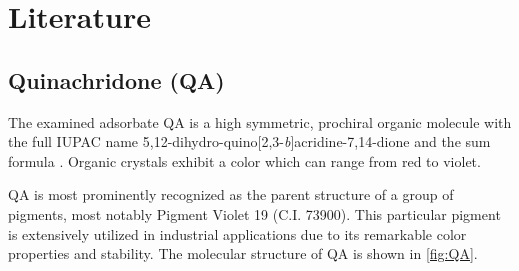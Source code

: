 \chapter{Literature}
\section{Quinachridone (QA)}

The examined adsorbate \acf{QA} is a high symmetric, prochiral organic molecule with the full IUPAC name 5,12-dihydro-quino[2,3-\textit{b}]acridine-7,14-dione and the sum formula . Organic crystals exhibit a color which can range from red to violet.\autocite{ChemicalBook2025,ChemSpider2025}

\ac{QA} is most prominently recognized as the parent structure of a group of pigments, most notably Pigment Violet 19 (C.I. 73900). This particular pigment is extensively utilized in industrial applications due to its remarkable color properties and stability.\autocite{ChemicalBook2025,ChemSpider2025} The molecular structure of \ac{QA} is shown in \autoref{fig:QA}.

